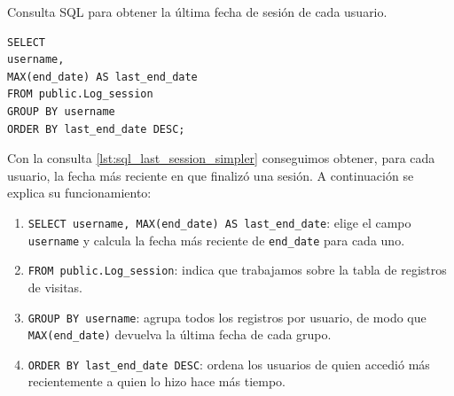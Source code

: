 \documentclass[a4paper, 12pt]{book}
\begin{document}
\begin{listing}[h!]
\caption{Consulta SQL para obtener la última fecha de sesión de cada usuario.}{}
\label{lst:sql_last_session_simpler}
\begin{verbatim}
SELECT
username,
MAX(end_date) AS last_end_date
FROM public.Log_session
GROUP BY username
ORDER BY last_end_date DESC;
\end{verbatim}
\end{listing}

Con la consulta \ref{lst:sql_last_session_simpler} conseguimos obtener, para cada usuario, la fecha más reciente en que finalizó una sesión. A continuación se explica su funcionamiento:

\begin{enumerate}
    \item \texttt{SELECT username, MAX(end\_date) AS last\_end\_date}: elige el campo \texttt{username} y calcula la fecha más reciente de \texttt{end\_date} para cada uno.
    \item \texttt{FROM public.Log\_session}: indica que trabajamos sobre la tabla de registros de visitas.
    \item \texttt{GROUP BY username}: agrupa todos los registros por usuario, de modo que \texttt{MAX(end\_date)} devuelva la última fecha de cada grupo.
    \item \texttt{ORDER BY last\_end\_date DESC}: ordena los usuarios de quien accedió más recientemente a quien lo hizo hace más tiempo.
\end{enumerate}




\cleardoublepage

%
% 

\raggedright\printbibliography[heading=bibintoc,title={Referencias}]
\end{document}

